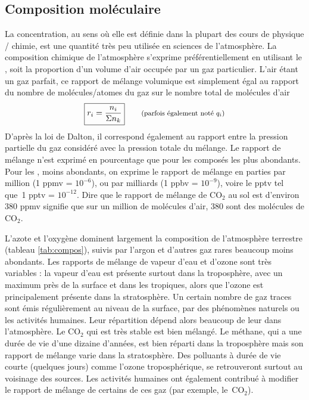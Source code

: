 \sk
\subsection{Composition moléculaire}

\sk
La concentration, au sens où elle est définie dans la plupart des cours de physique / chimie, est une quantité très peu utilisée en sciences de l'atmosphère. La composition chimique de l'atmosphère s'exprime préférentiellement en utilisant le , soit la proportion d'un volume d'air occupée par un gaz particulier. L'air étant un gaz parfait, ce rapport de mélange volumique est simplement égal au rapport du nombre de molécules/atomes du gaz sur le nombre total de molécules d'air $$ \boxed{ r_i=\frac{n_i}{\Sigma n_k} } \qquad \textrm{\footnotesize (parfois également noté $q_i$)} $$ D'après la loi de Dalton, il correspond également au rapport entre la pression partielle du gaz considéré avec la pression totale du mélange. Le rapport de mélange n'est exprimé en pourcentage que pour les composés les plus abondants. Pour les , moins abondants, on exprime le rapport de mélange en parties par million (1 ppmv = $10^{-6}$), ou par milliards (1 ppbv = $10^{-9}$), voire le pptv tel que~1 pptv = $10^{-12}$. Dire que le rapport de mélange de CO$_2$ au sol est d’environ 380 ppmv signifie que sur un million de molécules d’air, 380 sont des molécules de CO$_2$. %



\sk
L'azote et l'oxygène dominent largement la composition de l'atmosphère terrestre (tableau \ref{tab:compos}), suivis par l'argon et d'autres gaz rares beaucoup moins abondants. Les rapports de mélange de vapeur d'eau et d'ozone sont très variables : la vapeur d'eau est présente surtout dans la troposphère, avec un maximum près de la surface et dans les tropiques, alors que l'ozone est principalement présente dans la stratosphère. Un certain nombre de gaz traces sont émis régulièrement au niveau de la surface, par des phénomènes naturels ou les activités humaines. Leur répartition dépend alors beaucoup de leur  dans l'atmosphère. Le CO$_2$ qui est très stable est bien mélangé. Le méthane, qui a une durée de vie d'une dizaine d'années, est bien réparti dans la troposphère mais son rapport de mélange varie dans la stratosphère. Des polluants à durée de vie courte (quelques jours) comme l'ozone troposphérique, se retrouveront surtout au voisinage des sources. Les activités humaines ont également contribué à modifier le rapport de mélange de certains de ces gaz (par exemple, le~CO$_2$).

